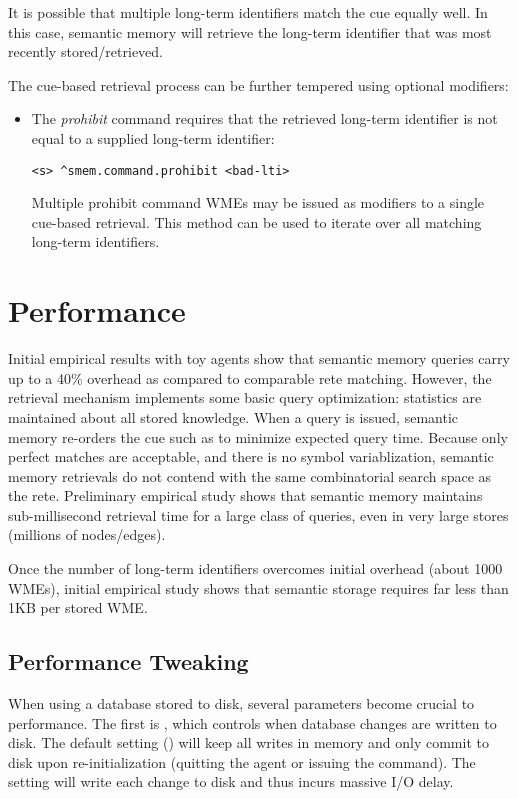 It is possible that multiple long-term identifiers match the cue equally well. 
In this case, semantic memory will retrieve the long-term identifier that was most recently stored/retrieved.

The cue-based retrieval process can be further tempered using optional modifiers:

\begin{itemize}

\item 
The \emph{prohibit} command requires that the retrieved long-term identifier is not equal to a supplied long-term identifier:
\begin{verbatim}
<s> ^smem.command.prohibit <bad-lti>
\end{verbatim}
Multiple prohibit command WMEs may be issued as modifiers to a single cue-based retrieval.  
This method can be used to iterate over all matching long-term identifiers.
\end{itemize}

\section{Performance}
\label{SMEM-perf}

Initial empirical results with toy agents show that semantic memory queries carry up to a 40\% overhead as compared to comparable rete matching.  
However, the retrieval mechanism implements some basic query optimization: statistics are maintained about all stored knowledge.  
When a query is issued, semantic memory re-orders the cue such as to minimize expected query time.  
Because only perfect matches are acceptable, and there is no symbol variablization, semantic memory retrievals do not contend with the same combinatorial search space as the rete.  
Preliminary empirical study shows that semantic memory maintains sub-millisecond retrieval time for a large class of queries, even in very large stores (millions of nodes/edges).

Once the number of long-term identifiers overcomes initial overhead (about 1000 WMEs), initial empirical study shows that semantic storage requires far less than 1KB per stored WME.

\subsection{Performance Tweaking}

When using a database stored to disk, several parameters become crucial to performance.  
The first is , which controls when database changes are written to disk.   
The default setting () will keep all writes in memory and only commit to disk upon re-initialization (quitting the agent or issuing the  command).  
The  setting will write each change to disk and thus incurs massive I/O delay.

